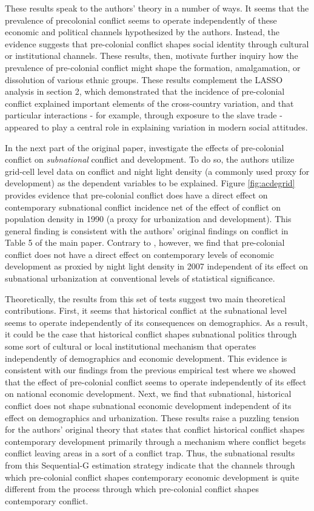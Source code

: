 These results speak to the authors' theory in a number of ways. It seems that the prevalence of precolonial conflict seems to operate independently of these economic and political channels hypothesized by the authors. Instead, the evidence suggests that pre-colonial conflict shapes social identity through cultural or institutional channels. These results, then, motivate further inquiry how the prevalence of pre-colonial conflict might shape the formation, amalgamation, or dissolution of various ethnic groups. These results complement the LASSO analysis in section 2, which demonstrated that the incidence of pre-colonial conflict explained important elements of the cross-country variation, and that particular interactions - for example, through exposure to the slave trade - appeared to play a central role in explaining variation in modern social attitudes. 

In the next part of the original paper, \citet{BesleyRQ2014} investigate the effects of pre-colonial conflict on \emph{subnational} conflict and development. To do so, the authors utilize grid-cell level data on conflict and night light density (a commonly used proxy for development) as the dependent variables to be explained. Figure \ref{fig:acdegrid} provides evidence that pre-colonial conflict does have a direct effect on contemporary subnational conflict incidence net of the effect of conflict on population density in 1990 (a proxy for urbanization and development). This general finding is consistent with the authors' original findings on conflict in Table 5 of the main paper. Contrary to \citet{BesleyRQ2014}, however, we find that pre-colonial conflict does not have a direct effect on contemporary levels of economic development as proxied by night light density in 2007 independent of its effect on subnational urbanization at conventional levels of statistical significance. 

Theoretically, the results from this set of tests suggest two main theoretical contributions. First, it seems that historical conflict at the subnational level seems to operate independently of its consequences on demographics. As a result, it could be the case that historical conflict shapes subnational politics through some sort of cultural or local institutional mechanism that operates independently of demographics and economic development. This evidence is consistent with our findings from the previous empirical test where we showed that the effect of pre-colonial conflict seems to operate independently of its effect on national economic development. Next, we find that subnational, historical conflict does not shape subnational economic development independent of its effect on demographics and urbanization. These results raise a puzzling tension for the authors' original theory that states that conflict historical conflict shapes contemporary development primarily through a mechanism where conflict begets conflict leaving areas in a sort of a conflict trap. Thus, the subnational results from this Sequential-G estimation strategy indicate that the channels through which pre-colonial conflict shapes contemporary economic development is quite different from the process through which pre-colonial conflict shapes contemporary conflict. 

